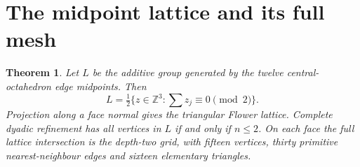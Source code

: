 \documentclass[10pt,a4paper,twocolumn]{article}
\newtheorem{theorem}{Theorem}
\newcommand{\Z}{\mathbb Z}
\begin{document}
\section*{The midpoint lattice and its full mesh}
\begin{theorem}
Let $L$ be the additive group generated by the twelve central-octahedron edge midpoints. Then
\begin{equation}
 L=\tfrac12\{z\in\Z^3:\textstyle\sum z_j\equiv0\pmod2\}.
\end{equation}
Projection along a face normal gives the triangular Flower lattice. Complete dyadic refinement has all vertices in $L$ if and only if $n\le2$. On each face the full lattice intersection is the depth-two grid, with fifteen vertices, thirty primitive nearest-neighbour edges and sixteen elementary triangles.
\end{theorem}
\end{document}
